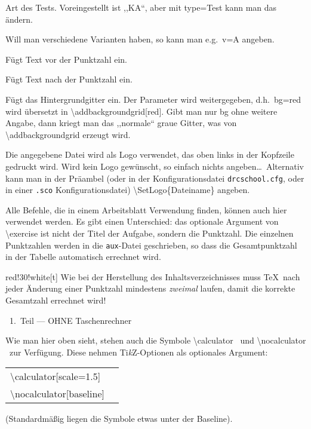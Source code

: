 \documentclass[hyperworksheet]{drcschool}
\makeatletter
\newcommand*{\cs}[1]{\textup{\ttfamily\textbackslash#1}}                   %
\newcommand*{\opt}[1]{\textup{\ttfamily#1}}                                %
\newcommand*{\param}[1]{\mbox{\normalfont$\langle$\textit{#1}$\rangle$}}   %
\newcommand*{\TikZ}{\textup{Ti\textit{k}Z}}                                %
\newcommand*{\onlytikz}{%
   \textcolor{red}{%
      \vtop{%
         \vbox{%
            \vss                                                           %
            \hrule height\p@                                               %
            \kern2\p@                                                      %
            \hbox{\normalfont\normalsize! \TikZ\ !}%
         }%
         \kern2\p@                                                         %
         \hrule height\p@                                                  %
      }%
   }%
}                                                                          %
\makeatother
\begin{document}
\begin{test}[2,M,class=9a,date=32.\ Oktober 2022,v=A,ptspre=>,ptspost=<,logo=example-image]
\begin{compactdesc}
\item[\ttfamily type] Art des Tests. Voreingestellt ist ,,KA``, aber mit \opt{type=Test} kann man das ändern.
\item[\ttfamily version/variant/v] Will man verschiedene Varianten haben, so kann man
   e.g.~\opt{v=A} angeben.
\item[\ttfamily ptspre/prepts] Fügt Text vor der Punktzahl ein.
\item[\ttfamily ptspost/postpts] Fügt Text nach der Punktzahl ein.
\item[\ttfamily background/bg=\param{\TikZ\ Optionen}] Fügt das Hintergrundgitter ein. Der Parameter wird weitergegeben, d.h.\
   \opt{bg=red} wird übersetzt in \cs{addbackgroundgrid[red]}. Gibt man nur \opt{bg}
   ohne weitere Angabe, dann kriegt man das ,,normale`` graue Gitter, was von
   \cs{addbackgroundgrid} erzeugt wird.
\item[\ttfamily logo=\param{Dateiname}] Die angegebene Datei wird
   als Logo verwendet, das oben links in der Kopfzeile gedruckt wird. Wird kein Logo
   gewünscht, so einfach nichts angeben\ldots\ Alternativ kann man in der Präambel
   (oder in der Konfigurationsdatei \texttt{drcschool.cfg}, oder in einer
   \texttt{.sco} Konfigurationsdatei) \cs{SetLogo\{Dateiname\}} angeben.
\end{compactdesc}

Alle Befehle, die in einem Arbeitsblatt Verwendung finden, können auch hier
verwendet werden. Es gibt einen Unterschied: das optionale Argument von \cs{exercise}
ist nicht der Titel der Aufgabe, sondern die Punktzahl. Die einzelnen Punktzahlen
werden in die \texttt{aux}-Datei geschrieben, so dass die Gesamtpunktzahl in
der Tabelle automatisch errechnet wird.

\noindent
\begin{colorminipage}{red!30!white}[t]{\linewidth}
Wie bei der Herstellung des Inhaltsverzeichnisses muss \TeX\ nach jeder Änderung
einer Punktzahl mindestens \emph{zweimal} laufen, damit die korrekte Gesamtzahl
errechnet wird!
\end{colorminipage}

\begin{center}
\nocalculator\ 1.\ Teil --- OHNE Taschenrechner
\end{center}
\leavevmode\llap{\onlytikz\quad}%
Wie man hier oben sieht, stehen auch die Symbole \cs{calculator} \calculator\
und \cs{nocalculator} \nocalculator\ zur Verfügung. Diese nehmen \TikZ-Optionen
als optionales Argument:
\begin{tabular}[t]{l@{\space\textrightarrow\space}l}
\cs{calculator[scale=1.5]}  & \calculator[scale=1.5] \\
\cs{nocalculator[baseline]} & \nocalculator[baseline]
\end{tabular}\par\noindent
(Standardmäßig liegen die Symbole etwas unter der Baseline).


\end{test}
\end{document}
